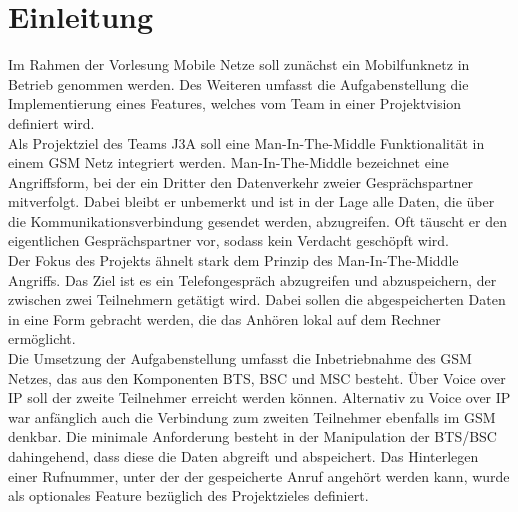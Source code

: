 \section{Einleitung}
Im Rahmen der Vorlesung Mobile Netze soll zunächst ein Mobilfunknetz in Betrieb genommen werden. Des Weiteren umfasst die Aufgabenstellung die Implementierung eines Features, welches vom Team in einer Projektvision definiert wird. \\

Als Projektziel des Teams J3A soll eine Man-In-The-Middle Funktionalität in einem GSM Netz integriert werden. Man-In-The-Middle bezeichnet eine Angriffsform, bei der ein Dritter den Datenverkehr zweier Gesprächspartner mitverfolgt. Dabei bleibt er unbemerkt und ist in der Lage alle Daten, die über die Kommunikationsverbindung gesendet werden, abzugreifen. Oft täuscht er den eigentlichen Gesprächspartner vor, sodass kein Verdacht geschöpft wird.\\

Der Fokus des Projekts ähnelt stark dem Prinzip des Man-In-The-Middle Angriffs. Das Ziel ist es ein Telefongespräch abzugreifen und abzuspeichern, der zwischen zwei Teilnehmern getätigt wird. Dabei sollen die abgespeicherten Daten in eine Form gebracht werden, die das Anhören lokal auf dem Rechner ermöglicht. \\

Die Umsetzung der Aufgabenstellung umfasst die Inbetriebnahme des GSM Netzes, das aus den Komponenten BTS, BSC und MSC besteht. Über Voice over IP soll der zweite Teilnehmer erreicht werden können. Alternativ zu Voice over IP war anfänglich auch die Verbindung zum zweiten Teilnehmer ebenfalls im GSM denkbar. Die minimale Anforderung besteht in der Manipulation der BTS/BSC dahingehend, dass diese die Daten abgreift und abspeichert. Das Hinterlegen einer Rufnummer, unter der der gespeicherte Anruf angehört werden kann, wurde als optionales Feature bezüglich des Projektzieles definiert.
